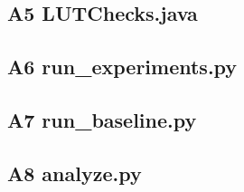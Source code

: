 \documentclass[11pt,letterpaper]{article}
\begin{document}
\subsection*{A5 LUTChecks.java}

\newpage
\subsection*{A6 run\_experiments.py}

\subsection*{A7 run\_baseline.py}

\newpage
\subsection*{A8 analyze.py}

\end{document}
